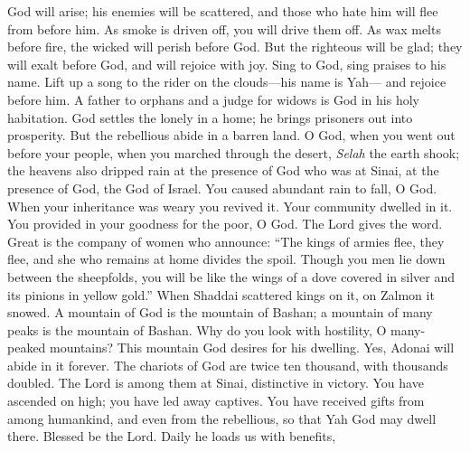 \begin{biblechapter} %
 God will arise; his enemies will be scattered, 
and those who hate him will flee from before him.
\verse As smoke is driven off, you will drive them off. 
As wax melts before fire, 
the wicked will perish before God.
\verse But the righteous will be glad; they will exalt before God, 
and will rejoice with joy.
\verse Sing to God, sing praises to his name. 
Lift up a song to the rider on the clouds—his name is Yah— 
and rejoice before him.
\verse A father to orphans and a judge for widows 
is God in his holy habitation.
\verse God settles the lonely in a home; 
he brings prisoners out into prosperity. 
But the rebellious abide in a barren land.
\verse O God, when you went out before your people, 
when you marched through the desert, \textit{Selah}
\verse the earth shook; the heavens also dripped rain 
at the presence of God who was at Sinai, 
at the presence of God, the God of Israel.
\verse You caused abundant rain to fall, O God. 
When your inheritance was weary you revived it.
\verse Your community dwelled in it. 
You provided in your goodness for the poor, O God.
\verse The Lord gives the word. 
Great is the company of women who announce:
\verse “The kings of armies flee, they flee, 
and she who remains at home divides the spoil.
\verse Though you men lie down between the sheepfolds, 
you will be like the wings of a dove covered in silver 
and its pinions in yellow gold.”
\verse When Shaddai scattered kings on it, 
on Zalmon it snowed.
\verse A mountain of God is the mountain of Bashan; 
a mountain of many peaks is the mountain of Bashan.
\verse Why do you look with hostility, O many-peaked mountains? 
This mountain God desires for his dwelling. 
Yes, Adonai will abide in it forever.
\verse The chariots of God 
are twice ten thousand, with thousands doubled. 
The Lord is among them at Sinai, distinctive in victory.
\verse You have ascended on high; you have led away captives. 
You have received gifts from among humankind, 
and even from the rebellious, so that Yah God may dwell there.
\verse Blessed be the Lord. Daily he loads us with benefits, 

\end{biblechapter}
